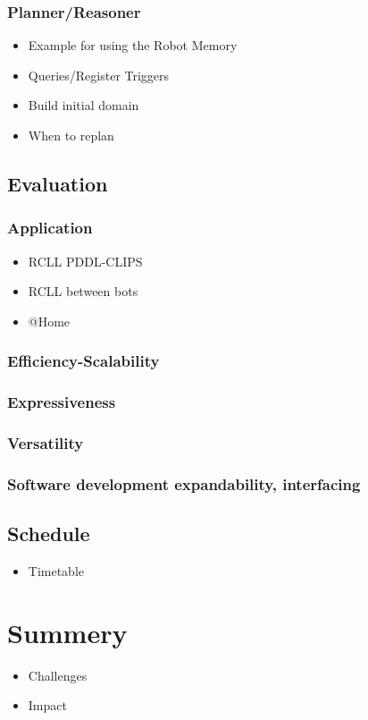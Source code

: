 \documentclass[a4paper,11pt]{article}
\begin{document}
\subsubsection{Planner/Reasoner}
\label{sec:impl-planner}
\begin{itemize}
\item Example for using the Robot Memory
\item Queries/Register Triggers
\item Build initial domain
\item When to replan
\end{itemize}

\subsection{Evaluation}
\label{sec:eval}
\subsubsection{Application}
\label{sec:eval-apl}
\begin{itemize}
\item RCLL PDDL-CLIPS
\item RCLL between bots
\item @Home
\end{itemize}
\subsubsection{Efficiency-Scalability}
\subsubsection{Expressiveness}
\subsubsection{Versatility}
\subsubsection{Software development expandability, interfacing}
\subsection{Schedule}
\begin{itemize}
\item Timetable
\end{itemize}

\section{Summery}
\label{sec:summery}
\begin{itemize}
\item Challenges
\item Impact
\end{itemize}




\end{document}
